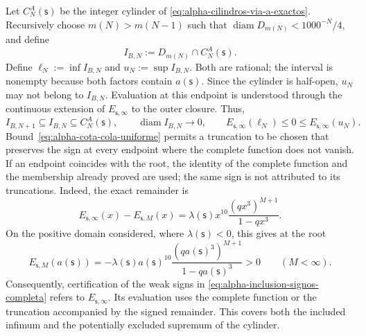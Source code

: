 Let \(C_N^A(\mathsf s)\) be the integer cylinder of
\eqref{eq:alpha-cilindros-via-a-exactos}. Recursively choose
\(m(N)>m(N-1)\) such that
\(\operatorname{diam}D_{m(N)}<1000^{-N}/4\), and define
\begin{equation}
I_{B,N}:=D_{m(N)}\cap C_N^A(\mathsf s).
 \label{eq:alpha-intervalos-b-completos}
\end{equation}
Define
\(\ell_N:=\inf I_{B,N}\) and \(u_N:=\sup I_{B,N}\). Both are rational;
the interval is nonempty because both factors contain
\(a(\mathsf s)\). Since the cylinder is half-open, \(u_N\) may not
belong to \(I_{B,N}\). Evaluation at this endpoint is understood through
the continuous extension of \(E_{\mathsf s,\infty}\) to the outer closure. Thus,
\begin{equation}
 I_{B,N+1}\subseteq I_{B,N}\subseteq C_N^A(\mathsf s),
 \qquad \operatorname{diam}I_{B,N}\longrightarrow0,
 \qquad E_{\mathsf s,\infty}(\ell_N)\leq0\leq
 E_{\mathsf s,\infty}(u_N).
 \label{eq:alpha-inclusion-signos-completa}
\end{equation}
Bound~\eqref{eq:alpha-cota-cola-uniforme} permits a truncation to be
chosen that preserves the sign at every endpoint where the complete function
does not vanish. If an endpoint coincides with the root, the identity of
the complete function and the membership already proved are used; the same
sign is not attributed to its truncations. Indeed, the exact remainder is
\[
 E_{\mathsf s,\infty}(x)-E_{\mathsf s,M}(x)
 =\lambda(\mathsf s)x^{10}
   \frac{(qx^3)^{M+1}}{1-qx^3}.
\]
On the positive domain considered, where \(\lambda(\mathsf s)<0\), this
gives at the root
\[
 E_{\mathsf s,M}(a(\mathsf s))
 =-\lambda(\mathsf s)a(\mathsf s)^{10}
   \frac{(qa(\mathsf s)^3)^{M+1}}{1-qa(\mathsf s)^3}>0
 \qquad(M<\infty).
\]
Consequently, certification of the weak signs in
\eqref{eq:alpha-inclusion-signos-completa} refers to
\(E_{\mathsf s,\infty}\). Its evaluation uses the complete function or the
truncation accompanied by the signed remainder. This covers both the included
infimum and the potentially excluded supremum of the cylinder.

